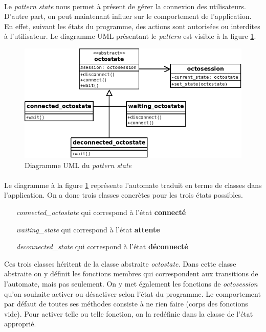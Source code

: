 \documentclass[a4paper]{article}
\begin{document}
			\paragraph{}{
			Le \textit{pattern state} nous permet à présent de gérer la connexion des utilisateurs. D'autre part,
			on peut maintenant influer sur le comportement de l'application. En effet, suivant les états du programme,
			des actions sont autorisées ou interdites à l'utilisateur. Le diagramme UML présentant le \textit{pattern}
			est visible à la figure \ref{state_uml}.
			}
			
			\begin{figure}[!ht]
				\centering
				\includegraphics[scale=0.6]{UML/state.png}
				\caption{\label{state_uml} Diagramme UML du \textit{pattern state}}
			\end{figure}
			
			\paragraph{}{
			Le diagramme à la figure \ref{state_uml} représente l'automate traduit en terme de classes dans l'application.
			On a donc trois classes concrètes pour les trois états possibles.
			    \begin{itemize}
			        \item[\textit{connected\_octostate}] qui correspond à l'état \textbf{connecté}
			        \item[\textit{waiting\_state}] qui correspond à l'état \textbf{attente}
			        \item[\textit{deconnected\_state}] qui correspond à l'état \textbf{déconnecté}
			    \end{itemize}
			Ces trois classes héritent de la classe abstraite \textit{octostate}. Dans cette classe abstraite on y définit
			les fonctions membres qui correspondent aux transitions de l'automate, mais pas seulement. On y met également les
			fonctions de \textit{octosession} qu'on souhaite activer ou désactiver selon l'état du programme. Le comportement
			par défaut de toutes ses méthodes consiste à ne rien faire (corps des fonctions vide). Pour activer telle ou
			telle fonction, on la redéfinie dans la classe de l'état approprié.
			}
\end{document}
